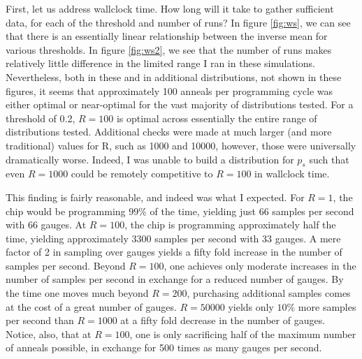 First, let us address wallclock time. How long will it take to gather sufficient data, for each of the threshold and number of runs? In figure \ref{fig:ws}, we can see that there is an essentially linear relationship between the inverse mean for various thresholds. In figure \ref{fig:ws2}, we see that the number of runs makes relatively little difference in the limited range I ran in these simulations. Nevertheless, both in these and in additional distributions, not shown in these figures, it seems that approximately 100 anneals per programming cycle was either optimal or near-optimal for the vast majority of distributions tested. For a threshold of 0.2, $R=100$ is optimal across essentially the entire range of distributions tested. Additional checks were made at much larger (and more traditional) values for R, such as 1000 and 10000, however, those were universally dramatically worse. Indeed, I was unable to build a distribution for $p_s$ such that even $R=1000$ could be remotely competitive to $R=100$ in wallclock time.

This finding is fairly reasonable, and indeed was what I expected. For $R=1$, the chip would be programming $99\%$ of the time, yielding just 66 samples per second with 66 gauges. At $R=100$, the chip is programming approximately half the time, yielding approximately 3300 samples per second with 33 gauges. A mere factor of 2 in sampling over gauges yields a fifty fold increase in the number of samples per second. Beyond $R=100$, one achieves only moderate increases in the number of samples per second in exchange for a reduced number of gauges. By the time one moves much beyond $R=200$, purchasing additional samples comes at the cost of a great number of gauges. $R=50000$ yields only $10\%$ more samples per second than $R=1000$ at a fifty fold decrease in the number of gauges. Notice, also, that at $R=100$, one is only sacrificing half of the maximum number of anneals possible, in exchange for 500 times as many gauges per second.

